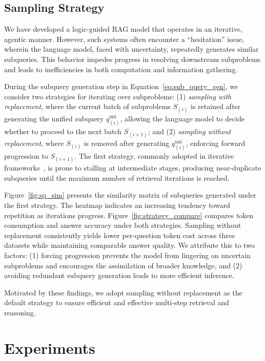 \documentclass[letterpaper]{article} %
\begin{document}
\subsection{Sampling Strategy}

We have developed a logic-guided RAG model that operates in an iterative, agentic manner. However, such systems often encounter a ``hesitation'' issue, wherein the language model, faced with uncertainty, repeatedly generates similar subqueries. This behavior impedes progress in resolving downstream subproblems and leads to inefficiencies in both computation and information gathering.

During the subquery generation step in Equation~\ref{eq:sub_query_gen}, we consider two strategies for iterating over subproblems: (1) \textit{sampling with replacement}, where the current batch of subproblems \( S_{(i)} \) is retained after generating the unified subquery \( q^{\text{uni}}_{(i)} \), allowing the language model to decide whether to proceed to the next batch \( S_{(i+1)} \); and (2) \textit{sampling without replacement}, where \( S_{(i)} \) is removed after generating \( q^{\text{uni}}_{(i)} \), enforcing forward progression to \( S_{(i+1)} \). The first strategy, commonly adopted in iterative frameworks~\citep{fu2023specializing,yang2024rag,li2021graph}, is prone to stalling at intermediate stages, producing near-duplicate subqueries until the maximum number of retrieval iterations is reached.

Figure~\ref{fig:sq_sim} presents the similarity matrix of subqueries generated under the first strategy. The heatmap indicates an increasing tendency toward repetition as iterations progress. Figure~\ref{fig:strategy_compare} compares token consumption and answer accuracy under both strategies. Sampling without replacement consistently yields lower per-question token cost across three datasets while maintaining comparable answer quality. We attribute this to two factors: (1) forcing progression prevents the model from lingering on uncertain subproblems and encourages the assimilation of broader knowledge, and (2) avoiding redundant subquery generation leads to more efficient inference.

Motivated by these findings, we adopt sampling without replacement as the default strategy to ensure efficient and effective multi-step retrieval and reasoning.



\section{Experiments}
\end{document}
